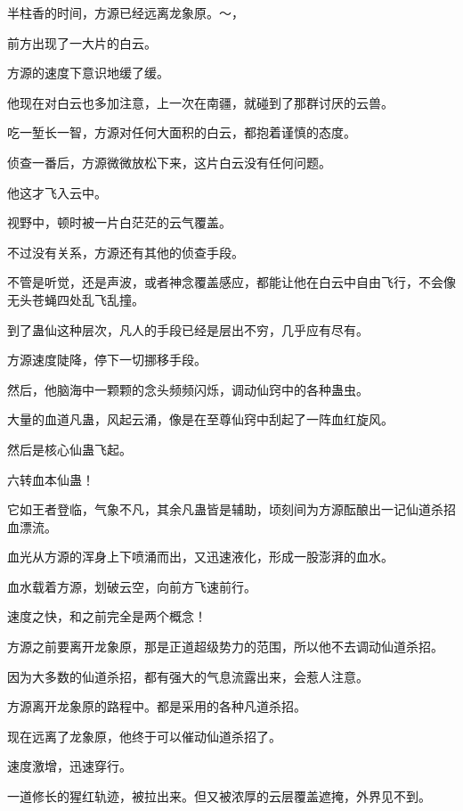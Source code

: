 
\begin{this_body}



半柱香的时间，方源已经远离龙象原。～，

前方出现了一大片的白云。

方源的速度下意识地缓了缓。

他现在对白云也多加注意，上一次在南疆，就碰到了那群讨厌的云兽。

吃一堑长一智，方源对任何大面积的白云，都抱着谨慎的态度。

侦查一番后，方源微微放松下来，这片白云没有任何问题。

他这才飞入云中。

视野中，顿时被一片白茫茫的云气覆盖。

不过没有关系，方源还有其他的侦查手段。

不管是听觉，还是声波，或者神念覆盖感应，都能让他在白云中自由飞行，不会像无头苍蝇四处乱飞乱撞。

到了蛊仙这种层次，凡人的手段已经是层出不穷，几乎应有尽有。

方源速度陡降，停下一切挪移手段。

然后，他脑海中一颗颗的念头频频闪烁，调动仙窍中的各种蛊虫。

大量的血道凡蛊，风起云涌，像是在至尊仙窍中刮起了一阵血红旋风。

然后是核心仙蛊飞起。

六转血本仙蛊！

它如王者登临，气象不凡，其余凡蛊皆是辅助，顷刻间为方源酝酿出一记仙道杀招血漂流。

血光从方源的浑身上下喷涌而出，又迅速液化，形成一股澎湃的血水。

血水载着方源，划破云空，向前方飞速前行。

速度之快，和之前完全是两个概念！

方源之前要离开龙象原，那是正道超级势力的范围，所以他不去调动仙道杀招。

因为大多数的仙道杀招，都有强大的气息流露出来，会惹人注意。

方源离开龙象原的路程中。都是采用的各种凡道杀招。

现在远离了龙象原，他终于可以催动仙道杀招了。

速度激增，迅速穿行。

一道修长的猩红轨迹，被拉出来。但又被浓厚的云层覆盖遮掩，外界见不到。


\end{this_body}
